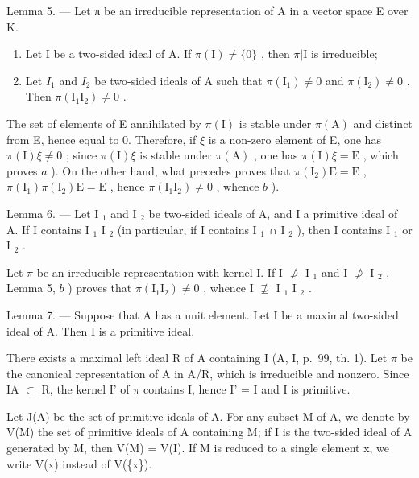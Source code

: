 Lemma 5. --- Let π be an irreducible representation of A in a vector space E over K.

\begin{enumerate}
\def\labelenumi{\alph{enumi})}
\item
  Let I be a two-sided ideal of A. If \(\pi(\mathrm{I}) \neq \{0\}\) , then \(\pi|\mathrm{I}\) is irreducible;
\item
  Let \(I_{1}\) and \(I_{2}\) be two-sided ideals of A such that \(\pi(\mathrm{I}_{1}) \neq 0\) and \(\pi(\mathrm{I}_{2}) \neq 0\) . Then \(\pi(\mathrm{I}_{1}\mathrm{I}_{2}) \neq 0\) .
\end{enumerate}

The set of elements of E annihilated by \(\pi(\mathrm{I})\) is stable under \(\pi(\mathrm{A})\) and distinct from E, hence equal to 0. Therefore, if \(\xi\) is a non-zero element of E, one has \(\pi(\mathrm{I})\xi \neq 0\) ; since \(\pi(\mathrm{I})\xi\) is stable under \(\pi(\mathrm{A})\) , one has \(\pi(\mathrm{I})\xi = \mathrm{E}\) , which proves \(a\) ). On the other hand, what precedes proves that \(\pi(\mathrm{I}_2)\mathrm{E} = \mathrm{E}\) , \(\pi(\mathrm{I}_1)\pi(\mathrm{I}_2)\mathrm{E} = \mathrm{E}\) , hence \(\pi(\mathrm{I}_1\mathrm{I}_2) \neq 0\) , whence \(b\) ).

Lemma 6. --- Let I \(_{1}\) and I \(_{2}\) be two-sided ideals of A, and I a primitive ideal of A. If I contains I \(_{1}\) I \(_{2}\) (in particular, if I contains I \(_{1}\) ∩ I \(_{2}\) ), then I contains I \(_{1}\) or I \(_{2}\) .

Let \(\pi\) be an irreducible representation with kernel I. If I \(\not\supseteq\) I \(_1\) and I \(\not\supseteq\) I \(_2\) , Lemma 5, \(b\) ) proves that \(\pi(\text{I}_1\text{I}_2) \neq 0\) , whence I \(\not\supseteq\) I \(_1\) I \(_2\) .

Lemma 7. --- Suppose that A has a unit element. Let I be a maximal two-sided ideal of A. Then I is a primitive ideal.

There exists a maximal left ideal R of A containing I (A, I, p.~99, th. 1). Let \(\pi\) be the canonical representation of A in A/R, which is irreducible and nonzero. Since IA \(\subset\) R, the kernel I' of \(\pi\) contains I, hence I' = I and I is primitive.

Let J(A) be the set of primitive ideals of A. For any subset M of A, we denote by V(M) the set of primitive ideals of A containing M; if I is the two-sided ideal of A generated by M, then V(M) = V(I). If M is reduced to a single element x, we write V(x) instead of V(\{x\}).

